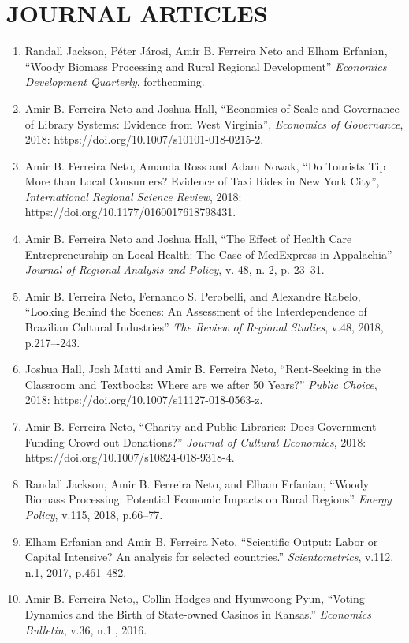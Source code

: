 \documentclass[11pt,a4paper,oneside]{article}
\begin{document}
\section{JOURNAL ARTICLES}
\begin{enumerate}
  \item Randall Jackson, P\'eter J\'arosi, Amir B. Ferreira Neto and Elham Erfanian, ``Woody Biomass Processing and Rural Regional Development'' \emph{Economics Development Quarterly}, forthcoming.
  \item Amir B. Ferreira Neto and Joshua Hall, ``Economies of Scale and Governance of Library Systems: Evidence from West Virginia'', \emph{Economics of Governance}, 2018: https://doi.org/10.1007/s10101-018-0215-2.
  \item Amir B. Ferreira Neto, Amanda Ross and Adam Nowak, ``Do Tourists Tip More than Local Consumers? Evidence of Taxi Rides in New York City'',  \emph{International Regional Science Review}, 2018: https://doi.org/10.1177/0160017618798431.
  \item Amir B. Ferreira Neto and Joshua Hall, ``The Effect of Health Care Entrepreneurship on Local Health: The Case of MedExpress in Appalachia'' \emph{Journal of Regional Analysis and Policy}, v. 48, n. 2, p. 23--31.
  \item Amir B. Ferreira Neto, Fernando S. Perobelli, and Alexandre Rabelo, ``Looking Behind the Scenes: An Assessment of the Interdependence of Brazilian Cultural Industries'' \emph{The Review of Regional Studies}, v.48, 2018, p.217–-243.
  \item Joshua Hall, Josh Matti and Amir B. Ferreira Neto, ``Rent-Seeking in the Classroom and Textbooks: Where are we after 50 Years?'' \emph{Public Choice}, 2018: https://doi.org/10.1007/s11127-018-0563-z.
  \item Amir B. Ferreira Neto, ``Charity and Public Libraries: Does Government Funding Crowd out Donations?'' \emph{Journal of Cultural Economics}, 2018: https://doi.org/10.1007/s10824-018-9318-4.
  \item  Randall Jackson, Amir B. Ferreira Neto, and Elham Erfanian, ``Woody Biomass Processing: Potential Economic Impacts on Rural Regions'' \emph{Energy Policy}, v.115, 2018, p.66--77.
  \item Elham Erfanian and Amir B. Ferreira Neto, ``Scientific Output: Labor or Capital Intensive? An analysis for selected countries.'' \emph{Scientometrics}, v.112, n.1, 2017, p.461--482.
  \item Amir B. Ferreira Neto,, Collin Hodges and Hyunwoong Pyun, ``Voting Dynamics and the Birth of State-owned Casinos in Kansas.'' \emph{Economics Bulletin}, v.36, n.1., 2016.

\end{enumerate}
\end{document}
